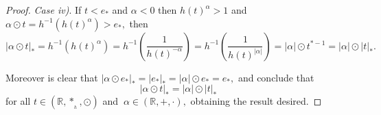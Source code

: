 \documentclass[10pt]{amsart}
\numberwithin{equation}{section}
\begin{document}
\begin{proof}
\medskip

\noindent \textit{Case iv)}. If $t < e_*$ and $\alpha < 0$ then  $h(t)^\alpha > 1$ and $\alpha \odot t= h^{-1}(h(t)^\alpha) > e_*,$ then
    $$
    |\alpha \odot t|_*  = h^{-1}(h(t)^{\alpha}) = h^{-1}\left(\frac{1}{h(t)^{-\alpha}}\right) =  h^{-1}\left(\frac{1}{h(t)^{|\alpha|}}\right) = |\alpha| \odot t^{*-1}   = |\alpha| \odot |t|_*    .$$

\medskip
Moreover is clear that $|\alpha \odot e_*|_* = |e_*|_* = |\alpha| \odot e_* = e_* ,$ and conclude that 
$$
|\alpha \odot t|_* = |\alpha| \odot |t|_*
$$
for all $t \in (\mathbb R,*_{_h},\odot)$ and $ \ \alpha \in (\mathbb R,+,\cdot),$ obtaining the result desired.

\end{proof}
\end{document}
